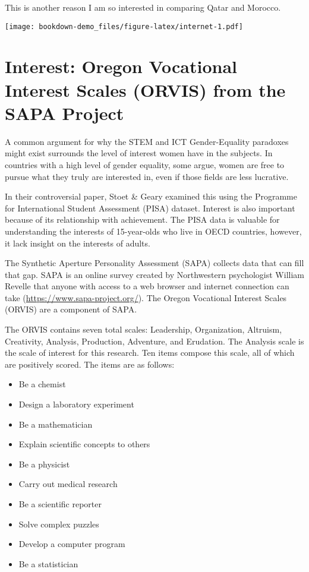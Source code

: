 \documentclass[]{book}
\providecommand{\tightlist}{%
  \setlength{\itemsep}{0pt}\setlength{\parskip}{0pt}}
\begin{document}
This is another reason I am so interested in comparing Qatar and
Morocco.

\texttt{[image: bookdown-demo\_files/figure-latex/internet-1.pdf]}

\section{Interest: Oregon Vocational Interest Scales (ORVIS) from the
SAPA
Project}\label{interest-oregon-vocational-interest-scales-orvis-from-the-sapa-project}

A common argument for why the STEM and ICT Gender-Equality paradoxes
might exist surrounds the level of interest women have in the subjects.
In countries with a high level of gender equality, some argue, women are
free to pursue what they truly are interested in, even if those fields
are less lucrative.

In their controversial paper, Stoet \& Geary examined this using the
Programme for International Student Assessment (PISA) dataset. Interest
is also important because of its relationship with achievement. The PISA
data is valuable for understanding the interests of 15-year-olds who
live in OECD countries, however, it lack insight on the interests of
adults.

The Synthetic Aperture Personality Assessment (SAPA) collects data that
can fill that gap. SAPA is an online survey created by Northwestern
psychologist William Revelle that anyone with access to a web browser
and internet connection can take (\url{https://www.sapa-project.org/}).
The Oregon Vocational Interest Scales (ORVIS) are a component of SAPA.

The ORVIS contains seven total scales: Leadership, Organization,
Altruism, Creativity, Analysis, Production, Adventure, and Erudation.
The Analysis scale is the scale of interest for this research. Ten items
compose this scale, all of which are positively scored. The items are as
follows:

\begin{itemize}
\tightlist
\item
  Be a chemist
\item
  Design a laboratory experiment
\item
  Be a mathematician
\item
  Explain scientific concepts to others
\item
  Be a physicist
\item
  Carry out medical research
\item
  Be a scientific reporter
\item
  Solve complex puzzles
\item
  Develop a computer program
\item
  Be a statistician
\end{itemize}
\end{document}

